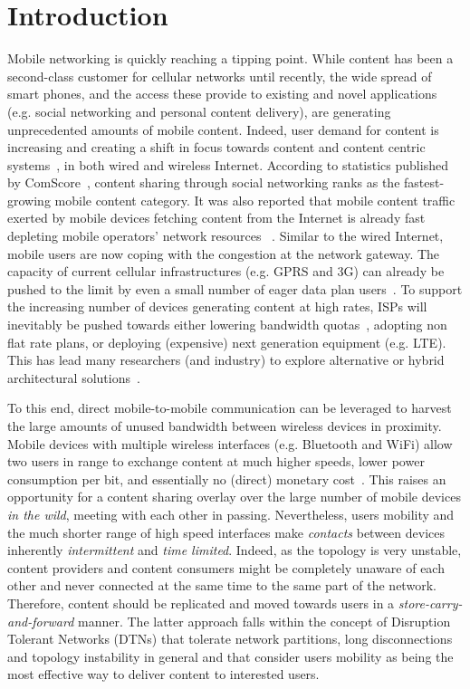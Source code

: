 \chapter{Introduction}
\label{chapter:Introduction}

Mobile networking is quickly reaching a tipping point. While content has been a second-class customer for cellular networks until recently, the wide spread of smart phones, and the access these provide to existing and novel applications (e.g. social networking and personal content delivery), are generating unprecedented amounts of mobile content. Indeed, user demand for content is increasing and creating a shift in focus towards content and content centric systems~\cite{CCN}, in both wired and wireless Internet. According to statistics published by ComScore~\cite{ComScore}, content sharing through social networking ranks as the fastest-growing mobile content category. It was also reported that mobile content traffic exerted by mobile devices fetching content from the Internet is already fast depleting mobile operators' network resources~\cite{ATT,ATT2,Killer-DTN} . Similar to the wired Internet, mobile users are now coping with the congestion at the network gateway. The capacity of current cellular infrastructures (e.g. GPRS and 3G) can already be pushed to the limit by even a small number of eager data plan users~\cite{ATT}. To support the increasing number of devices generating content at high rates, ISPs will inevitably be pushed towards either lowering bandwidth quotas~\cite{ATT}, adopting non flat rate plans, or deploying (expensive) next generation equipment (e.g. LTE). This has lead many researchers (and industry) to explore alternative or hybrid architectural solutions~\cite{CellOffLoading,Augmenting3G}. 

To this end, direct mobile-to-mobile communication can be leveraged to harvest the large amounts of unused bandwidth between wireless devices in proximity. Mobile devices with multiple wireless interfaces (e.g. Bluetooth and WiFi) allow two users in range to exchange content at much higher speeds, lower power consumption per bit, and essentially no (direct) monetary cost~\cite{Energy-Delay}. This raises an opportunity for a content sharing overlay over the large number of mobile devices \emph{in the wild}, meeting with each other in passing. Nevertheless, users mobility and the much shorter range of high speed interfaces make \emph{contacts} between devices inherently \emph{intermittent} and \emph{time limited}. Indeed, as the topology is very unstable, content providers and content consumers might be completely unaware of each other and never connected at the same time to the same part of the network. Therefore, content should be replicated and moved towards users in a \emph{store-carry-and-forward} manner. The latter approach falls within the concept of Disruption Tolerant Networks (DTNs) that tolerate network partitions, long disconnections and topology instability in general and that consider users mobility as being the most effective way to deliver content to interested users. 

